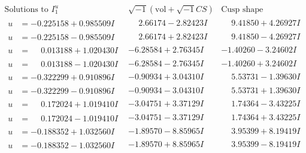 \documentclass[1p]{elsarticle_modified}
\theoremstyle{definition}
\newcommand{\I}{\sqrt{-1}}
\begin{document}
$$\begin{array}{c|c|c}  
\text{Solutions to }I^u_{1}& \I (\text{vol} + \sqrt{-1}CS) & \text{Cusp shape}\\
 \hline 
\begin{aligned}
u &= -0.225158 + 0.985509 I\end{aligned}
 & \phantom{-}2.66174 - 2.82423 I & \phantom{-}9.41850 + 4.26927 I \\ \hline\begin{aligned}
u &= -0.225158 - 0.985509 I\end{aligned}
 & \phantom{-}2.66174 + 2.82423 I & \phantom{-}9.41850 - 4.26927 I \\ \hline\begin{aligned}
u &= \phantom{-}0.013188 + 1.020430 I\end{aligned}
 & -6.28584 + 2.76345 I & -1.40260 - 3.24602 I \\ \hline\begin{aligned}
u &= \phantom{-}0.013188 - 1.020430 I\end{aligned}
 & -6.28584 - 2.76345 I & -1.40260 + 3.24602 I \\ \hline\begin{aligned}
u &= -0.322299 + 0.910896 I\end{aligned}
 & -0.90934 + 3.04310 I & \phantom{-}5.53731 - 1.39630 I \\ \hline\begin{aligned}
u &= -0.322299 - 0.910896 I\end{aligned}
 & -0.90934 - 3.04310 I & \phantom{-}5.53731 + 1.39630 I \\ \hline\begin{aligned}
u &= \phantom{-}0.172024 + 1.019410 I\end{aligned}
 & -3.04751 + 3.37129 I & \phantom{-}1.74364 - 3.43225 I \\ \hline\begin{aligned}
u &= \phantom{-}0.172024 - 1.019410 I\end{aligned}
 & -3.04751 - 3.37129 I & \phantom{-}1.74364 + 3.43225 I \\ \hline\begin{aligned}
u &= -0.188352 + 1.032560 I\end{aligned}
 & -1.89570 - 8.85965 I & \phantom{-}3.95399 + 8.19419 I \\ \hline\begin{aligned}
u &= -0.188352 - 1.032560 I\end{aligned}
 & -1.89570 + 8.85965 I & \phantom{-}3.95399 - 8.19419 I \\ \hline\begin{aligned}

\end{aligned}
\end{array}$$
\end{document}
